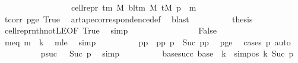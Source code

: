 \begin{isabellebody}
\ \ \ \ \ \ \ \ \ \ \ \ \ \ \ \ {\isacharequal}{\kern0pt}\ cell{\isacharunderscore}{\kern0pt}repr\ {\isacharparenleft}{\kern0pt}{\isasymGamma}{\isacharunderscore}{\kern0pt}tm\ M{\isacharparenright}{\kern0pt}\ {\isacharparenleft}{\kern0pt}bl{\isacharunderscore}{\kern0pt}tm\ M{\isacharparenright}{\kern0pt}\ {\isacharparenleft}{\kern0pt}tM\ p{\isacharparenright}{\kern0pt}\ {\isacharbang}{\kern0pt}\ m{\isachardoublequoteclose}\isanewline
\ \ \ \ \ \ \ \ \ \ \isamarkupfalse%
\ tcorr\ pge{}\ True\ \isamarkupfalse%
\ ar{\isacharunderscore}{\kern0pt}tape{\isacharunderscore}{\kern0pt}correspondence{\isacharunderscore}{\kern0pt}def\ \isamarkupfalse%
\ blast\isanewline
\ \ \ \ \ \ \ \ \isamarkupfalse%
\ {\isacharquery}{\kern0pt}thesis\ \isamarkupfalse%
\ cell{\isacharunderscore}{\kern0pt}repr{\isacharunderscore}{\kern0pt}nth{\isacharunderscore}{\kern0pt}not{\isacharunderscore}{\kern0pt}LE{}{\isacharbrackleft}{\kern0pt}OF\ True{\isacharbrackright}{\kern0pt}\ \isamarkupfalse%
\ simp\isanewline
\ \ \ \ \ \ \isamarkupfalse%
\isanewline
\ \ \ \ \ \ \ \ \isamarkupfalse%
\ False\isanewline
\ \ \ \ \ \ \ \ \isamarkupfalse%
\ meq{\isacharcolon}{\kern0pt}\ {\isachardoublequoteopen}m\ {\isacharequal}{\kern0pt}\ {\isacharquery}{\kern0pt}k{\isachardoublequoteclose}\ \isamarkupfalse%
\ mle\ \isamarkupfalse%
\ simp\isanewline
\ \ \ \ \ \ \ \ \isamarkupfalse%
\ pp\ \ pp{\isacharcolon}{\kern0pt}\ {\isachardoublequoteopen}p\ {\isacharequal}{\kern0pt}\ Suc\ pp{\isachardoublequoteclose}\ \isamarkupfalse%
\ pge{}\ \isamarkupfalse%
\ {\isacharparenleft}{\kern0pt}cases\ p{\isacharparenright}{\kern0pt}\ auto\isanewline
\ \ \ \ \ \ \ \ \isamarkupfalse%
\ psuc{}{\isacharcolon}{\kern0pt}\ {\isachardoublequoteopen}{}\ {\isasymle}\ Suc\ p{\isachardoublequoteclose}\ \isamarkupfalse%
\ simp\isanewline
\ \ \ \ \ \ \ \ \isamarkupfalse%
\ base{\isacharunderscore}{\kern0pt}succ{\isacharcolon}{\kern0pt}\ {\isachardoublequoteopen}{\isacharquery}{\kern0pt}base\ {\isacharplus}{\kern0pt}\ {\isacharquery}{\kern0pt}k\ {\isacharequal}{\kern0pt}\ sim{\isacharunderscore}{\kern0pt}pos\ {\isacharquery}{\kern0pt}k\ {\isacharparenleft}{\kern0pt}Suc\ p{\isacharparenright}{\kern0pt}{\isachardoublequoteclose}\isanewline

\end{isabellebody}
